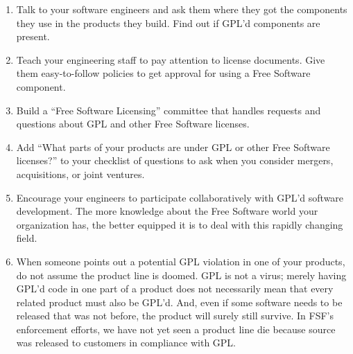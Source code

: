 \documentclass[12pt]{report}
\begin{document}
\begin{enumerate}

\item Talk to your software engineers and ask them where they got the
  components they use in the products they build.  Find out if GPL'd
  components are present.

\item Teach your engineering staff to pay attention to license documents.
  Give them easy-to-follow policies to get approval for using a Free
  Software component.

\item Build a ``Free Software Licensing'' committee that handles requests
  and questions about GPL and other Free Software licenses.

\item Add ``What parts of your products are under GPL or other Free
  Software licenses?'' to your checklist of questions to ask when you
  consider mergers, acquisitions, or joint ventures.

\item Encourage your engineers to participate collaboratively with GPL'd
  software development.  The more knowledge about the Free Software world
  your organization has, the better equipped it is to deal with this
  rapidly changing field.

\item When someone points out a potential GPL violation in one of your
  products, do not assume the product line is doomed.  GPL is not a virus;
  merely having GPL'd code in one part of a product does not necessarily
  mean that every related product must also be GPL'd.  And, even if some
  software needs to be released that was not before, the product will
  surely still survive.  In FSF's enforcement efforts, we have not yet
  seen a product line die because source was released to customers in
  compliance with GPL.

\end{enumerate}

\end{document}
